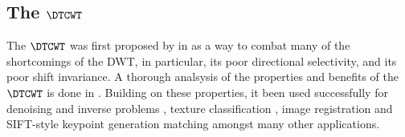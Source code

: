 
% 
\subsection{The $\DTCWT$}
  The $\DTCWT$ was first proposed by \citeauthor{kingsbury_dual-tree_1998} in
  \cite{kingsbury_dual-tree_1998, kingsbury_dual-tree_1998-1} as a way to combat
  many of the shortcomings of the DWT, in particular, its poor directional
  selectivity, and its poor shift invariance. A thorough analsysis of the
  properties and benefits of the $\DTCWT$ is done in
  \cite{kingsbury_image_1999,selesnick_dual-tree_2005}. Building on these
  properties, it been used
  successfully for denoising and inverse problems \cite{rivaz_bayesian_2001,
  zhang_bayesian_2008, zhang_variational_2015, miller_image_2008}, texture
  classification \cite{hatipoglu_texture_1999, rivaz_complex_1999}, image
  registration \cite{loo_motion-estimation-based_2001, chen_efficient_2012}
  and
  SIFT-style keypoint generation matching \cite{fauqueur_multiscale_2006,
  anderson_determining_2005, anderson_rotation-invariant_2006,
  bendale_multiscale_2010, ng_robust_2012} amongst many other applications. 

